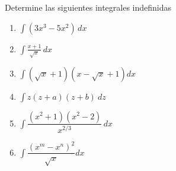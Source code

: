 \begin{Ejemplo} Determine las siguientes integrales indefinidas
\begin{multicols}{2}
\begin{enumerate}
\item $\displaystyle\int (3x^3-5x^2)\,dx$
\item $\displaystyle\int \frac{x+1}{\sqrt{x}}\,dx$
\item $\displaystyle\int (\sqrt{x}+1)(x-\sqrt{x}+1)dx$
\columnbreak
\item $\displaystyle\int  z(z+a)(z+b) \ dz $
\item $\displaystyle\int \dfrac{(x^2+1)(x^2-2)}{x^{2/3}}\,dx$
\item $\displaystyle\int \dfrac{(x^m-x^n)^2}{\sqrt{x}}dx$
\end{enumerate}
\end{multicols}
\end{Ejemplo}

